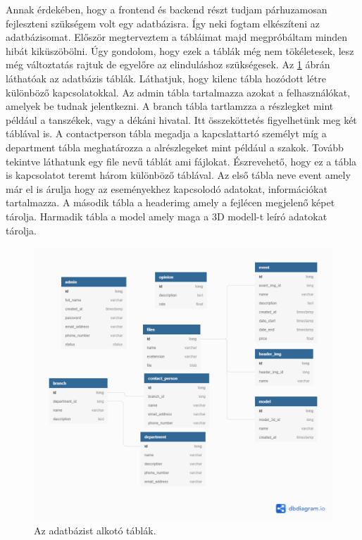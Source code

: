 Annak érdekében, hogy a frontend és backend részt tudjam párhuzamosan fejleszteni szükségem volt egy adatbázisra. Így neki fogtam elkészíteni az adatbázisomat. Először megterveztem a tábláimat majd megpróbáltam minden hibát kiküszöbölni. Úgy gondolom, hogy ezek a táblák még nem tökéletesek, lesz még változtatás rajtuk de egyelőre az elinduláshoz szükségesek. Az \ref{fig:database} ábrán láthatóak az adatbázis táblák. Láthatjuk, hogy kilenc tábla hozódott létre különböző kapcsolatokkal. Az admin tábla tartalmazza azokat a felhasználókat, amelyek be tudnak jelentkezni. A branch tábla tartlamzza a részlegket mint például a tanszékek, vagy a dékáni hivatal. Itt összeköttetés figyelhetünk meg két táblával is. A contactperson tábla megadja a kapcslattartó személyt míg a department tábla meghatározza a alrészlegeket mint például a szakok. Tovább tekintve láthatunk egy file nevű táblát ami fájlokat. Észrevehető, hogy ez a tábla is kapcsolatot teremt három különböző táblával. Az első tábla neve event amely már el is árulja hogy az eseményekhez kapcsolodó adatokat, információkat tartalmazza. A második tábla a headerimg amely a fejlécen megjelenő képet tárolja. Harmadik tábla a model amely maga a 3D modell-t leíró adatokat tárolja.
\begin{figure}
	\centering
	\includegraphics[scale=0.3]{figures/images/Sapi3dTour.png}
	\caption{Az adatbázist alkotó táblák.}
	\label{fig:database}
\end{figure}

